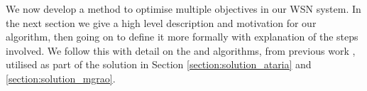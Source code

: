 We now develop a method to optimise multiple objectives in our WSN system. In the next section we give a high level description and motivation for our algorithm, then going on to define it more formally with explanation of the steps involved. We follow this with detail on the \acronymATARIA{}{} and \acronymMGRAO{}{} algorithms, from previous work \citep{creech2021dynamic,creech2021resource}, utilised as part of the solution in Section \ref{section:solution_ataria} and \ref{section:solution_mgrao}.
